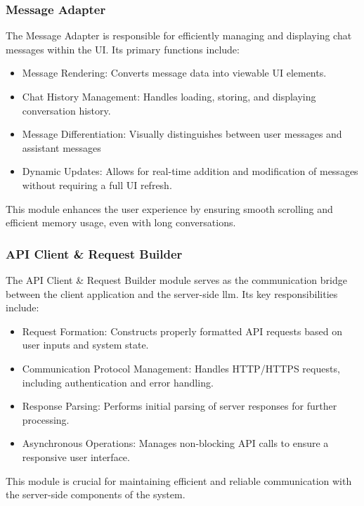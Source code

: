 \subsubsection{Message Adapter}
\label{subsec:messageadapter}
The Message Adapter is responsible for efficiently managing and displaying chat messages within the UI. Its primary functions include:
\begin{itemize}
    \item Message Rendering: Converts message data into viewable UI elements.
    \item Chat History Management: Handles loading, storing, and displaying conversation history.
    \item Message Differentiation: Visually distinguishes between user messages and assistant messages
    \item Dynamic Updates: Allows for real-time addition and modification of messages without requiring a full UI refresh.
\end{itemize}
This module enhances the user experience by ensuring smooth scrolling and efficient memory usage, even with long conversations.

\subsubsection{API Client \& Request Builder}
\label{subsec:apiclient}
The API Client \& Request Builder module serves as the communication bridge between the client application and the server-side \gls{llm}. Its key responsibilities include:
\begin{itemize}
    \item Request Formation: Constructs properly formatted API requests based on user inputs and system state.
    \item Communication Protocol Management: Handles HTTP/HTTPS requests, including authentication and error handling.
    \item Response Parsing: Performs initial parsing of server responses for further processing.
    \item Asynchronous Operations: Manages non-blocking API calls to ensure a responsive user interface.
\end{itemize}
This module is crucial for maintaining efficient and reliable communication with the server-side components of the system.

